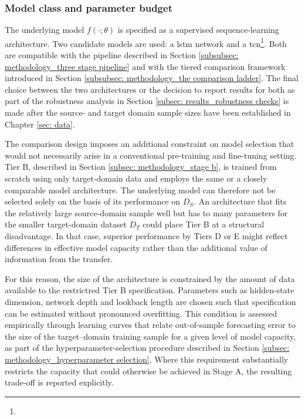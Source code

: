 \subsubsection{Model class and parameter budget} \label{subsubsec: methodology_stage a_model class and parameter budget}
The underlying model $f(\cdot; \theta)$ is specified as a supervised sequence-learning architecture. Two candidate models are used: a \ac{lstm} network and a \ac{tcn}\footnote{}. Both are compatible with the pipeline described in Section \ref{subsubsec: methodology_three stage pipeline} and with the tiered comparison framework introduced in Section \ref{subsubsec: methodology_the comparison ladder}. The final choice between the two architectures or the decision to report results for both as part of the robustness analysis in Section \ref{subsec: results_robustness checks} is made after the source- and target domain sample sizes have been established in Chapter \ref{sec: data}. 

The comparison design imposes an additional constraint on model selection that would not necessarily arise in a conventional pre-training and fine-tuning setting. Tier B, described in Section \ref{subsec: methodology_stage b}, is trained from scratch using only target-domain data and employs the same or a closely comparable model architecture. The underlying model can therefore not be selected solely on the basis of its performance on $D_S$. An architecture that fits the relatively large source-domain sample well but has to many parameters for the smaller target-domain dataset $D_T$ could place Tier B at a structural disadvantage. In that case, superior performance by Tiers D or E might reflect differences in effective model capacity rather than the additional value of information from the transfer. 

For this reason, the size of the architecture is constrained by the amount of data available to the restrictred Tier B specification. Parameters such as hidden-state dimension, network depth and lookback length are chosen such that specification can be estimated without pronounced overfitting. This condition is assessed empirically through learning curves that relate out-of-sample forecasting error to the size of the target--domain training sample for a given level of model capacity, as part of the hyperparameter-selection procedure described in Section \ref{subsec: methodology_hyperparameter selection}. Where this requirement substantially restricts the capacity that could otherwise be achieved in Stage A, the resulting trade-off is reported explicitly. 


